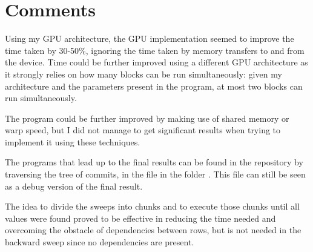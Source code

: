 \documentclass[a4paper,oneside]{report}
\begin{document}
    
    \begingroup
    \let\clearpage\relax
    \chapter*{Comments}
    \endgroup
    
    Using my GPU architecture, the GPU implementation seemed to improve the time taken by 30-50\%, ignoring the time taken by memory transfers to and from the device. Time could be further improved using a different GPU architecture as it strongly relies on how many blocks can be run simultaneously: given my architecture and the parameters present in the program, at most two blocks can run simultaneously.

    The program could be further improved by making use of shared memory or warp speed, but I did not manage to get significant results when trying to implement it using these techniques.

    The programs that lead up to the final results can be found in the repository by traversing the tree of commits, in the file  in the folder . This file can still be seen as a debug version of the final result.

    The idea to divide the sweeps into chunks and to execute those chunks until all values were found proved to be effective in reducing the time needed and overcoming the obstacle of dependencies between rows, but is not needed in the backward sweep since no dependencies are present. 
\end{document}
